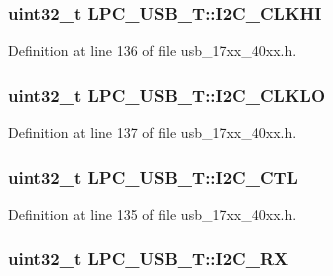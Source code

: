\subsubsection[{\texorpdfstring{I2\+C\+\_\+\+C\+L\+K\+HI}{I2C_CLKHI}}]{ uint32\+\_\+t L\+P\+C\+\_\+\+U\+S\+B\+\_\+\+T\+::\+I2\+C\+\_\+\+C\+L\+K\+HI}\hypertarget{structLPC__USB__T_a4207d0a27769cfec26cc2278295e8d39}{}\label{structLPC__USB__T_a4207d0a27769cfec26cc2278295e8d39}


Definition at line 136 of file usb\+\_\+17xx\+\_\+40xx.\+h.

\subsubsection[{\texorpdfstring{I2\+C\+\_\+\+C\+L\+K\+LO}{I2C_CLKLO}}]{ uint32\+\_\+t L\+P\+C\+\_\+\+U\+S\+B\+\_\+\+T\+::\+I2\+C\+\_\+\+C\+L\+K\+LO}\hypertarget{structLPC__USB__T_a75eae5ab45dff204e87ed40591cc6525}{}\label{structLPC__USB__T_a75eae5ab45dff204e87ed40591cc6525}


Definition at line 137 of file usb\+\_\+17xx\+\_\+40xx.\+h.

\subsubsection[{\texorpdfstring{I2\+C\+\_\+\+C\+TL}{I2C_CTL}}]{ uint32\+\_\+t L\+P\+C\+\_\+\+U\+S\+B\+\_\+\+T\+::\+I2\+C\+\_\+\+C\+TL}\hypertarget{structLPC__USB__T_aee5e8d943d1ea0db8a34c1fbd0e25282}{}\label{structLPC__USB__T_aee5e8d943d1ea0db8a34c1fbd0e25282}


Definition at line 135 of file usb\+\_\+17xx\+\_\+40xx.\+h.

\subsubsection[{\texorpdfstring{I2\+C\+\_\+\+RX}{I2C_RX}}]{ uint32\+\_\+t L\+P\+C\+\_\+\+U\+S\+B\+\_\+\+T\+::\+I2\+C\+\_\+\+RX}\hypertarget{structLPC__USB__T_aba18ad66bfe899933064e8e51f298a2f}{}\label{structLPC__USB__T_aba18ad66bfe899933064e8e51f298a2f}


